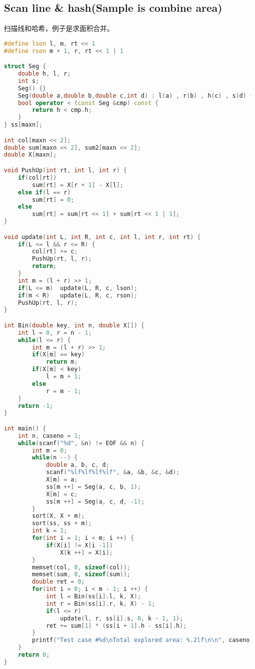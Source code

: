 \subsection{Scan line & hash(Sample is combine area)}
    扫描线和哈希，例子是求面积合并。
    \begin{lstlisting}[language=c++]
#define lson l, m, rt << 1
#define rson m + 1, r, rt << 1 | 1

struct Seg {
    double h, l, r;
    int s; 
    Seg() {}
    Seg(double a,double b,double c,int d) : l(a) , r(b) , h(c) , s(d) {}
	bool operator < (const Seg &cmp) const {
		return h < cmp.h;
	}
} ss[maxn];

int col[maxn << 2];
double sum[maxn << 2], sum2[maxn << 2];
double X[maxn];

void PushUp(int rt, int l, int r) {
    if(col[rt])
        sum[rt] = X[r + 1] - X[l];
    else if(l == r)
        sum[rt] = 0;
    else
        sum[rt] = sum[rt << 1] + sum[rt << 1 | 1];
}

void update(int L, int R, int c, int l, int r, int rt) {
    if(L <= l && r <= R) {
        col[rt] += c;
        PushUp(rt, l, r);
        return;
    }
    int m = (l + r) >> 1;
    if(L <= m)  update(L, R, c, lson);
    if(m < R)   update(L, R, c, rson);
    PushUp(rt, l, r);
}

int Bin(double key, int n, double X[]) {
    int l = 0, r = n - 1;
    while(l <= r) {
        int m = (l + r) >> 1;
        if(X[m] == key) 
            return m;
        if(X[m] < key)  
            l = m + 1;
        else
            r = m - 1;
    }
    return -1;
}

int main() {
    int n, caseno = 1;
    while(scanf("%d", &n) != EOF && n) {
        int m = 0;
        while(n --) {
            double a, b, c, d;
            scanf("%lf%lf%lf%lf", &a, &b, &c, &d);
            X[m] = a;
            ss[m ++] = Seg(a, c, b, 1);
            X[m] = c;
            ss[m ++] = Seg(a, c, d, -1);
        }
        sort(X, X + m);
        sort(ss, ss + m);
        int k = 1;
        for(int i = 1; i < m; i ++) {
            if(X[i] != X[i -1])
                X[k ++] = X[i];
        }
        memset(col, 0, sizeof(col));
        memset(sum, 0, sizeof(sum));
        double ret = 0;
        for(int i = 0; i < m - 1; i ++) {
            int l = Bin(ss[i].l, k, X);
            int r = Bin(ss[i].r, k, X) - 1;
            if(l <= r)
                update(l, r, ss[i].s, 0, k - 1, 1);
            ret += sum[1] * (ss[i + 1].h - ss[i].h);
        }
        printf("Test case #%d\nTotal explored area: %.2lf\n\n", caseno ++, ret);
    }
    return 0;
}
    \end{lstlisting}

